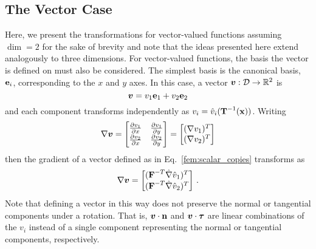 \documentclass[../doc.tex]{subfiles}
\begin{document}
\subsection{The Vector Case}
Here, we present the transformations for vector-valued functions assuming $\dim = 2$ for the sake of brevity and note that the ideas presented here extend analogously to three dimensions. 
For vector-valued functions, the basis the vector is defined on must also be considered. The simplest basis is the canonical basis, $\boldsymbol{\mathrm{e}}_i$, corresponding to the $x$ and $y$ axes. In this case, a vector $\boldsymbol{v} : \mathcal{D} \rightarrow \mathbb{R}^2$ is 
	\begin{equation} \label{fem:scalar_copies}
		\boldsymbol{v} = v_1 \boldsymbol{\mathrm{e}}_1 + v_2 \boldsymbol{\mathrm{e}}_2 
	\end{equation}
and each component transforms independently as $v_i = \hat{v}_i(\boldsymbol{\mathrm{T}}^{-1}(\boldsymbol{\mathrm{x}}))$. Writing
	\begin{equation}
		\nabla\boldsymbol{v} = \begin{bmatrix} 
			\frac{\partial v_1}{\partial x} & \frac{\partial v_1}{\partial y} \\ 
			\frac{\partial v_2}{\partial x} & \frac{\partial v_2}{\partial y}
		\end{bmatrix} = \begin{bmatrix} 
			(\nabla v_1)^T \\ 
			(\nabla v_2)^T 
		\end{bmatrix}		
	\end{equation}
then the gradient of a vector defined as in Eq.~\ref{fem:scalar_copies} transforms as 
	\begin{equation} \label{fem:scalar_copies_grad}
		\nabla\boldsymbol{v} = \begin{bmatrix} 
			(\boldsymbol{\mathrm{F}}^{-T} \hat{\nabla}\hat{v}_1)^T \\
			(\boldsymbol{\mathrm{F}}^{-T}\hat{\nabla}\hat{v}_2)^T 
		\end{bmatrix} \,. 
	\end{equation}
Note that defining a vector in this way does not preserve the normal or tangential components under a rotation. That is, $\boldsymbol{v}\cdot\boldsymbol{\mathrm{n}}$ and $\boldsymbol{v}\cdot\boldsymbol{\mathrm{\tau}}$ are linear combinations of the $v_i$ instead of a single component representing the normal or tangential components, respectively. 
\end{document}
